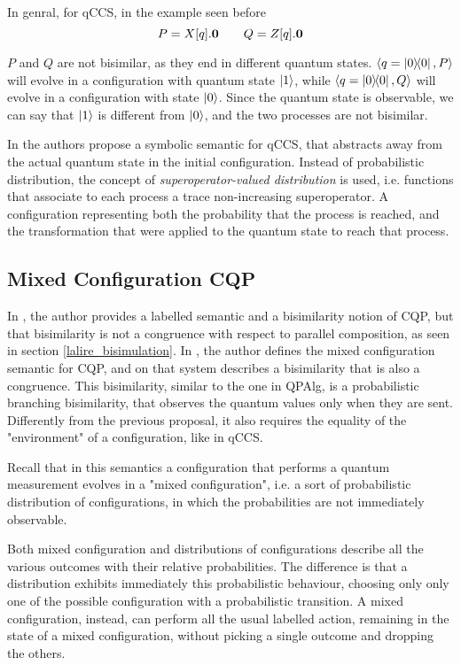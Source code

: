 In genral, for qCCS, in the example seen before
\[ P = X[q].\mathbf{0} \qquad Q = Z[q].\mathbf{0}\]

$P$ and $Q$ are not bisimilar, as they end in different quantum states. $\langle q = \ket{0}\!\!\bra{0}, P\rangle$ will evolve in a configuration with quantum state $\ket{1}$, while $\langle q = \ket{0}\!\!\bra{0}, Q\rangle$ will evolve in a configuration with state $\ket{0}$. Since the quantum state is observable, we can say that $\ket{1}$ is different from $\ket{0}$, and the two processes are not bisimilar.





In \cite{fengSymbolicBisimulationQuantum2014} the authors propose a symbolic semantic for qCCS, that abstracts away from the actual quantum state in the initial configuration. Instead of probabilistic distribution, the concept of \textit{superoperator-valued distribution} is used, i.e. functions that associate to each process a trace non-increasing superoperator. A configuration  representing both the probability that the process is reached, and the transformation that were applied to the quantum state to reach that process.

\subsection{Mixed Configuration CQP}


In \cite{davidsonFormalVerificationTechniques2012}, the author provides a labelled semantic and a bisimilarity notion of CQP, but that bisimilarity is not a congruence with respect to parallel composition, as seen in section \ref{lalire_bisimulation}. In \cite{davidsonFormalVerificationTechniques2012}, the author defines the mixed configuration semantic for CQP, and on that system describes a bisimilarity that is also a congruence. This bisimilarity, similar to the one in QPAlg, is a probabilistic branching bisimilarity, that observes the quantum values only when they are sent. Differently from the previous proposal, it also requires the equality of the "environment" of a configuration, like in qCCS.


Recall that in this semantics a configuration that performs a quantum  measurement evolves in a "mixed configuration", i.e. a sort of probabilistic distribution of configurations, in which the probabilities are not immediately observable.  


Both mixed configuration and distributions of configurations describe all the various outcomes with their relative probabilities. The difference is that a distribution exhibits immediately this probabilistic behaviour, choosing only  only one of the possible configuration with a probabilistic transition. A mixed configuration, instead, can perform all the usual labelled action, remaining in the state of a mixed configuration, without picking a single outcome and dropping the others.


